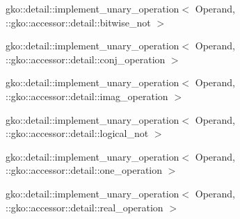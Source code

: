 \begin{DoxyCompactList}
\begin{DoxyCompactList}
\end{DoxyCompactList}
\item gko\+:\+:detail\+:\+:implement\+\_\+unary\+\_\+operation$<$ Operand, \+:\+:gko\+:\+:accessor\+:\+:detail\+:\+:bitwise\+\_\+not $>$\begin{DoxyCompactList}
\item {}
\end{DoxyCompactList}
\item gko\+:\+:detail\+:\+:implement\+\_\+unary\+\_\+operation$<$ Operand, \+:\+:gko\+:\+:accessor\+:\+:detail\+:\+:conj\+\_\+operation $>$\begin{DoxyCompactList}
\item {}
\end{DoxyCompactList}
\item gko\+:\+:detail\+:\+:implement\+\_\+unary\+\_\+operation$<$ Operand, \+:\+:gko\+:\+:accessor\+:\+:detail\+:\+:imag\+\_\+operation $>$\begin{DoxyCompactList}
\item {}
\end{DoxyCompactList}
\item gko\+:\+:detail\+:\+:implement\+\_\+unary\+\_\+operation$<$ Operand, \+:\+:gko\+:\+:accessor\+:\+:detail\+:\+:logical\+\_\+not $>$\begin{DoxyCompactList}
\item {}
\end{DoxyCompactList}
\item gko\+:\+:detail\+:\+:implement\+\_\+unary\+\_\+operation$<$ Operand, \+:\+:gko\+:\+:accessor\+:\+:detail\+:\+:one\+\_\+operation $>$\begin{DoxyCompactList}
\item {}
\end{DoxyCompactList}
\item gko\+:\+:detail\+:\+:implement\+\_\+unary\+\_\+operation$<$ Operand, \+:\+:gko\+:\+:accessor\+:\+:detail\+:\+:real\+\_\+operation $>$\begin{DoxyCompactList}

\end{DoxyCompactList}
\end{DoxyCompactList}
